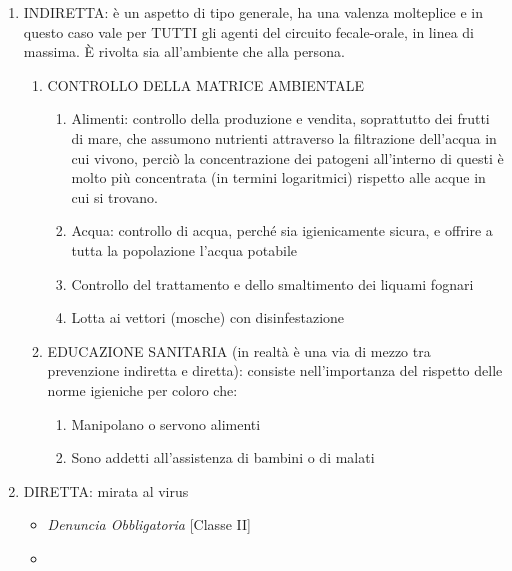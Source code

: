 \begin{enumerate}
\def\labelenumi{\arabic{enumi}.}
\item
  INDIRETTA: è un aspetto di tipo generale, ha una valenza molteplice e
  in questo caso vale per TUTTI gli agenti del circuito fecale-orale, in
  linea di massima. È rivolta sia all'ambiente che alla persona.

  \begin{enumerate}
  \def\labelenumii{\alph{enumii}.}
  \item
    CONTROLLO DELLA MATRICE AMBIENTALE

    \begin{enumerate}
    \def\labelenumiii{\roman{enumiii}.}
    \item
      Alimenti: controllo della produzione e vendita, soprattutto dei
      frutti di mare, che assumono nutrienti attraverso la filtrazione
      dell'acqua in cui vivono, perciò la concentrazione dei patogeni
      all'interno di questi è molto più concentrata (in termini
      logaritmici) rispetto alle acque in cui si trovano.
    \item
      Acqua: controllo di acqua, perché sia igienicamente sicura, e
      offrire a tutta la popolazione l'acqua potabile
    \item
      Controllo del trattamento e dello smaltimento dei liquami fognari
    \item
      Lotta ai vettori (mosche) con disinfestazione
    \end{enumerate}
  \item
    EDUCAZIONE SANITARIA (in realtà è una via di mezzo tra prevenzione
    indiretta e diretta): consiste nell'importanza del rispetto delle
    norme igieniche per coloro che:

    \begin{enumerate}
    \def\labelenumiii{\roman{enumiii}.}
    \item
      Manipolano o servono alimenti
    \item
      Sono addetti all'assistenza di bambini o di malati
    \end{enumerate}
  \end{enumerate}
\item
  DIRETTA: mirata al virus


\begin{itemize}
\item
   
  \emph{Denuncia Obbligatoria} {[}Classe II{]}
   
\item
   

\end{itemize}
\end{enumerate}
